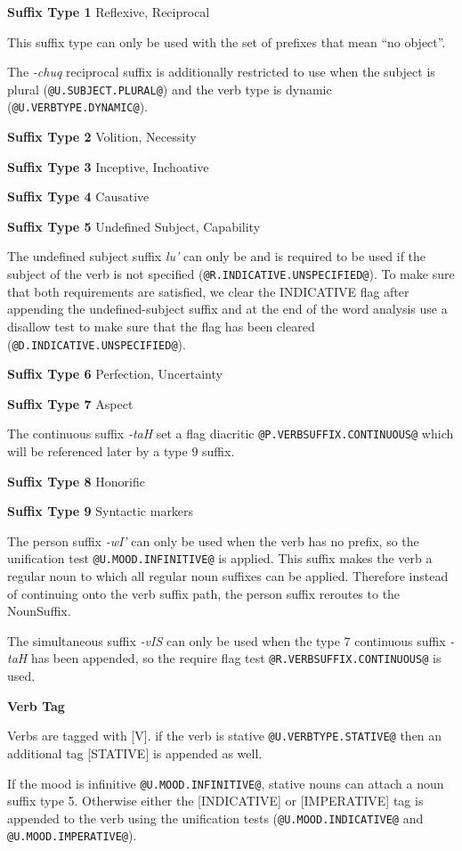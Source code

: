 \documentclass[11pt]{article}
\begin{document}
\textbf{Suffix Type 1} Reflexive, Reciprocal
	
This suffix type can only be used with the set of prefixes that mean ``no object''.

The \textit{-chuq} reciprocal suffix is additionally restricted to use when the subject is plural (\texttt{@U.SUBJECT.PLURAL@}) and the verb type is dynamic (\texttt{@U.VERBTYPE.DYNAMIC@}).

\textbf{Suffix Type 2} Volition, Necessity

\textbf{Suffix Type 3} Inceptive, Inchoative

\textbf{Suffix Type 4} Causative

\textbf{Suffix Type 5} Undefined Subject, Capability

The undefined subject suffix \textit{lu'} can only be and is required to be used if the subject of the verb is not specified (\texttt{@R.INDICATIVE.UNSPECIFIED@}). To make sure that both requirements are satisfied, we clear the INDICATIVE flag after appending the undefined-subject suffix and at the end of the word analysis use a disallow test to make sure that the flag has been cleared (\texttt{@D.INDICATIVE.UNSPECIFIED@}).

\textbf{Suffix Type 6} Perfection, Uncertainty

\textbf{Suffix Type 7} Aspect

The continuous suffix \textit{-taH} set a flag diacritic \texttt{@P.VERBSUFFIX.CONTINUOUS@} which will be referenced later by a type 9 suffix.

\textbf{Suffix Type 8} Honorific

\textbf{Suffix Type 9} Syntactic markers

The person suffix \textit{-wI'} can only be used when the verb has no prefix, so the unification test \texttt{@U.MOOD.INFINITIVE@} is applied. This suffix makes the verb a regular noun to which all regular noun suffixes can be applied. Therefore instead of continuing onto the verb suffix path, the person suffix reroutes to the NounSuffix.

The simultaneous suffix \textit{-vIS} can only be used when the type 7 continuous suffix \textit{-taH} has been appended, so the require flag test \texttt{@R.VERBSUFFIX.CONTINUOUS@} is used.

\textbf{Verb Tag}

Verbs are tagged with [V]. if the verb is stative \texttt{@U.VERBTYPE.STATIVE@} then an additional tag [STATIVE] is appended as well.

If the mood is infinitive \texttt{@U.MOOD.INFINITIVE@}, stative nouns can attach a noun suffix type 5. Otherwise either the [INDICATIVE] or [IMPERATIVE] tag is appended to the verb using the unification tests (\texttt{@U.MOOD.INDICATIVE@} and \texttt{@U.MOOD.IMPERATIVE@}).
\end{document}
